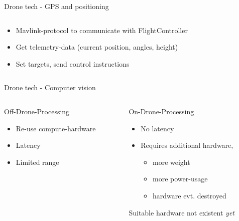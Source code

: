 \documentclass[aspectratio=169]{beamer}
\begin{document}
\begin{frame}{Drone tech - GPS and positioning}
\begin{columns}
	\begin{column}{.74\textwidth}
		\begin{itemize}
			\item Mavlink-protocol to communicate with FlightController
			\item Get telemetry-data (current position, angles, height)
			\item Set targets, send control instructions
		\end{itemize}
	\end{column}
	
	\end{columns}
\end{frame}
	
\begin{frame}{Drone tech - Computer vision}
	\begin{columns}
	
		\begin{column}{.49\textwidth}
			Off-Drone-Processing
			\begin{itemize}
				\item Re-use compute-hardware
				\item Latency
				\item Limited range
			\end{itemize}
		\end{column}

		\begin{column}{.49\textwidth}
			On-Drone-Processing
			\begin{itemize}
				\item No latency
				\item Requires additional hardware,
					\begin{itemize}
						\item more weight
						\item more power-usage
						\item hardware evt. destroyed
					\end{itemize}
			\end{itemize}
			Suitable hardware not existent \emph{yet}			
		\end{column}
	\end{columns}
\end{frame}
\end{document}
